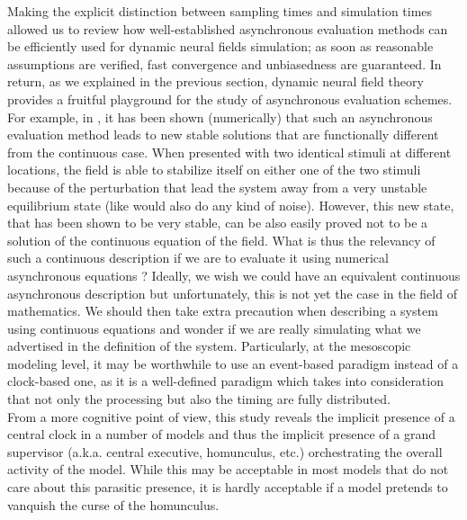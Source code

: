 Making the explicit distinction between sampling times and simulation times allowed us to review how well-established asynchronous evaluation methods can be efficiently used for dynamic neural fields simulation; as soon as reasonable assumptions are verified, fast convergence and unbiasedness are guaranteed. In return, as we explained in the previous section, dynamic neural field theory provides a fruitful playground for the study of asynchronous evaluation schemes. For example, in \cite{Rougier:2006}, it has been shown (numerically) that such an asynchronous evaluation method leads to new stable solutions that are functionally different from the continuous case. When presented with two identical stimuli at different locations, the field is able to stabilize itself on either one of the two stimuli because of the perturbation that lead the system away from a very unstable equilibrium state (like would also do any kind of noise). However, this new state, that has been shown to be very stable, can be also easily proved not to be a solution of the continuous equation of the field. What is thus the relevancy of such a continuous description if we are to evaluate it using numerical asynchronous equations ? Ideally, we wish we could have an equivalent continuous asynchronous description but unfortunately, this is not yet the case in the field of mathematics. We should then take extra precaution when describing a system using continuous equations and wonder if we are really simulating what we advertised in the definition of the system. Particularly, at the mesoscopic modeling level, it may be worthwhile to use an event-based paradigm instead of a clock-based one, as it is a well-defined paradigm which takes into consideration that not only the processing but also the timing are fully distributed.\\

From a more cognitive point of view, this study reveals the implicit presence of a central clock in a number of models and thus the implicit presence of a grand supervisor (a.k.a. central executive, homunculus, etc.) orchestrating the overall activity of the model. While this may be acceptable in most models that do not care about this parasitic presence, it is hardly acceptable if a model pretends to vanquish the curse of the homunculus.
